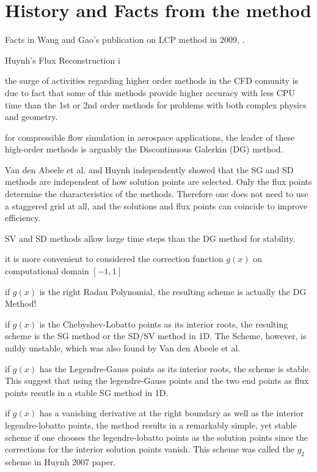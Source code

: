 \section*{History and Facts from the method}

\begin{frame}[allowframebreaks]
 Facts in Wang and Gao's publication on LCP method in 2009, \cite{Wang&Gao2009}.
 \begin{orangeitemize}
  \item Huynh's Flux Reconstruction i
  \item the surge of activities regarding higher order methods in the CFD comunity is due to fact that some of this methods provide higher accuracy with less CPU time than the 1st or 2nd order methods for problems with both complex physics and geometry.
  \item for compressible flow simulation in aerospace applications, the leader of these high-order methods is arguably the Discontinuous Galerkin (DG) method.
  \item Van den Abeele et al. and Huynh independently showed that the SG and SD methods are independent of how solution points are selected. Only the flux points determine the characteristics of the methods. Therefore one does not need to use a staggered grid at all, and the solutions and flux points can coincide to improve efficiency.
  \item SV and SD methods allow large time steps than the DG method for stability.
  \item it is more convenient to considered the correction function $g(x)$ on computational domain $[-1,1]$
  \item if $g(x)$ is the right Radau Polynomial, the resulting scheme is actually the DG Method!
  \item if $g(x)$ is the Chebyshev-Lobatto points as its interior roots, the resulting scheme is the SG method or the SD/SV method in 1D. The Scheme, however, is mildy unstable, which was also found by Van den Abeele et al.
  \item if $g(x)$ has the Legendre-Gauss points as its interior roots, the scheme is stable. This suggest that using the legendre-Gauss points and the two end points as flux points resutls in a stable SG method in 1D.
  \item if $g(x)$ has a vanishing derivative at the right boundary as well as the interior legendre-lobatto points, the method results in a remarkably simple, yet stable scheme if one chooses the legendre-lobatto points as the solution points since the corrections for the interior solution points vanish. This scheme was called the $g_2$ scheme in Huynh 2007 paper. 
 \end{orangeitemize}
\end{frame}


